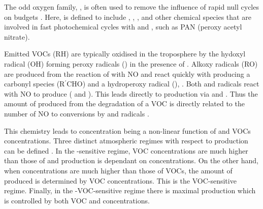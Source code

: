 The odd oxygen family, , is often used to remove the influence of rapid null cycles on  budgets \citep{Seinfeld:2006}. 
Here,  is defined to include , , ,  and other chemical species that are involved in fast photochemical cycles with  and , such as PAN (peroxy acetyl nitrate).

Emitted VOCs (RH) are typically oxidised in the troposphere by the hydoxyl radical (OH) forming peroxy radicals () in the presence of  . 
Alkoxy radicals (RO) are produced from the reaction of  with NO  and react quickly with  producing a carbonyl species (R$^{\prime}$CHO) and a hydroperoxy radical (), .
Both  and  radicals react with NO to produce  ( and ).
This leads directly to  production via  and . 
Thus the amount of  produced from the degradation of a VOC is directly related to the number of NO to  conversions by  and  radicals \citep{Atkinson:2000}.
\begin{reactionlist}
\end{reactionlist}

This chemistry leads to  concentration being a non-linear function of  and VOCs concentrations. 
Three distinct atmospheric regimes with respect to  production can be defined \citep{Jenkin:2000}. 
In the -sensitive regime, VOC concentrations are much higher than those of  and  production is dependant on  concentrations. 
On the other hand, when  concentrations are much higher than those of VOCs, the amount of  produced is determined by VOC concentrations. 
This is the VOC-sensitive regime. 
Finally, in the -VOC-sensitive regime there is maximal  production which is controlled by both VOC and  concentrations.

